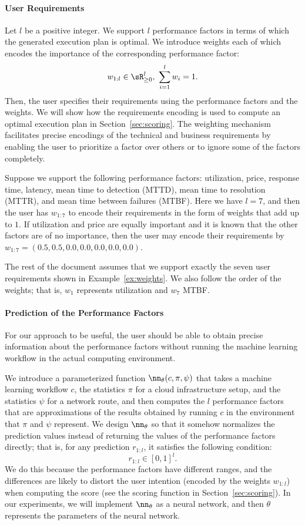 \documentclass[runningheads]{llncs}
\begin{document}
\paragraph{User Requirements}
Let $l$ be a positive integer. We support $l$ performance factors in terms of which the generated execution plan is optimal. We introduce weights each of which encodes the importance of the corresponding performance factor:
\[
w_{1:l} \in \sR_{\ge 0}^l,\ \sum_{i=1}^{l} w_i = 1.
\]
Then, the user specifies their requirements using the performance factors and the weights. We will show how the requirements encoding is used to compute an optimal execution plan in Section~\ref{sec:scoring}. The weighting mechanism facilitates precise encodings of the technical and business requirements by enabling the user to prioritize a factor over others or to ignore some of the factors completely.

\begin{example}
	\label{ex:weights}
	Suppose we support the following performance factors: utilization, price, response time, latency, mean time to detection (MTTD), mean time to resolution (MTTR), and mean time between failures (MTBF). Here we have $l=7$, and then the user has $w_{1:7}$ to encode their requirements in the form of weights that add up to $1$. If utilization and price are equally important and it is known that the other factors are of no importance, then the user may encode their requirements by $w_{1:7}=(0.5, 0.5, 0.0, 0.0, 0.0, 0.0, 0.0)$.
\end{example}

The rest of the document assumes that we support exactly the seven user requirements shown in Example~\ref{ex:weights}. We also follow the order of the weights; that is, $w_1$ represents utilization and $w_7$ MTBF.

\paragraph{Prediction of the Performance Factors}
For our approach to be useful, the user should be able to obtain precise information about the performance factors without running the machine learning workflow in the actual computing environment.

We introduce a parameterized function $\nn_\theta(c, \pi, \psi)$ that takes a machine learning workflow $c$, the statistics $\pi$ for a cloud infrastructure setup, and the statistics $\psi$ for a network route, and then computes the $l$ performance factors that are approximations of the results obtained by running $c$ in the environment that $\pi$ and $\psi$ represent. We design $\nn_\theta$ so that it somehow normalizes the prediction values instead of returning the values of the performance factors directly; that is, for any prediction $r_{1:l}$, it satisfies the following condition:
\[
r_{1:l} \in [0, 1]^l.
\]
We do this because the performance factors have different ranges, and the differences are likely to distort the user intention (encoded by the weights $w_{1:l}$) when computing the score (see the scoring function in Section~\ref{sec:scoring}). In our experiments, we will implement $\nn_\theta$ as a neural network, and then $\theta$ represents the parameters of the neural network.
\end{document}
